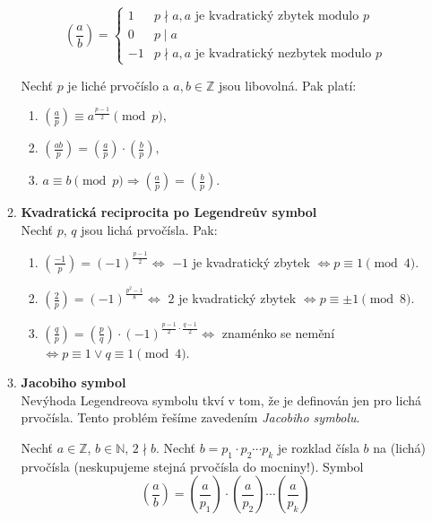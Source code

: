 \documentclass[12pt,a4paper]{article}
\begin{document}
\begin{enumerate}[leftmargin=*]
\begin{enumerate}
			\[ \genfrac(){}{0}{a}{b} = \left\{
				\begin{array}{ll}
					1 & p \nmid a, a \text{ je kvadratický zbytek modulo } p \\
					0 & p \mid a \\
					-1& p \nmid a, a \text{ je kvadratický nezbytek modulo } p
				\end{array}
			\right. \]

			Nechť $p$ je liché prvočíslo a $a, b \in \mathbb{Z}$ jsou libovolná.
			Pak platí:

			\begin{enumerate}
				\item $\genfrac(){}{1}{a}{p} \equiv  a^{\frac{p-1}{2}} \pmod{p},$
				\item $\genfrac(){}{1}{ab}{p} = \genfrac(){}{1}{a}{p} \cdot
					\genfrac(){}{1}{b}{p},$
				\item $a \equiv b \pmod{p} \Rightarrow \genfrac(){}{1}{a}{p}
					= \genfrac(){}{1}{b}{p}.$
			\end{enumerate}

		\item \textbf{Kvadratická reciprocita po Legendreův symbol}\\
			Nechť $p$, $q$ jsou lichá prvočísla. Pak:

			\begin{enumerate}
				\item $\genfrac(){}{1}{-1}{p} = (-1)^{\frac{p-1}{2}} \Leftrightarrow$
					$-1$ je kvadratický zbytek $\Leftrightarrow p \equiv 1 \pmod{4}$.
				\item $\genfrac(){}{1}{2}{p} = (-1)^{\frac{p^2-1}{8}} \Leftrightarrow$
					$2$ je kvadratický zbytek $\Leftrightarrow p \equiv \pm 1
					\pmod{8}$.
				\item $\genfrac(){}{1}{q}{p} = \genfrac(){}{1}{p}{q} \cdot
					(-1)^{\frac{p-1}{2} \cdot \frac{q-1}{2}} \Leftrightarrow$
					znaménko se nemění $\Leftrightarrow p \equiv 1 \vee
					q \equiv 1 \pmod{4}$.
			\end{enumerate}

		\item \textbf{Jacobiho symbol}\\
			Nevýhoda Legendreova symbolu tkví v tom, že je definován jen pro
			lichá prvočísla. Tento problém řešíme zavedením \textit{Jacobiho
			symbolu}.

			Nechť $a \in \mathbb{Z}$, $b \in \mathbb{N}$, $2 \nmid b$. Nechť
			$b = p_1 \cdot p_2 \cdots p_k$ je rozklad čísla $b$ na (lichá)
			prvočísla (neskupujeme stejná prvočísla do mocniny!). Symbol
			\[ \genfrac(){}{0}{a}{b} = \genfrac(){}{0}{a}{p_1} \cdot
				\genfrac(){}{0}{a}{p_2} \cdots \genfrac(){}{0}{a}{p_k} \]


\end{enumerate}
\end{enumerate}
\end{document}

